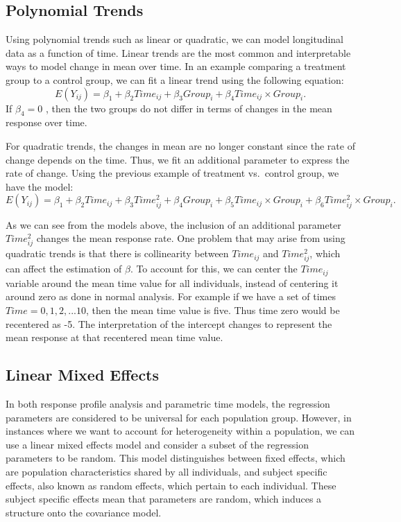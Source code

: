 \documentclass[12pt, twoside]{amherstthesis}
\begin{document}
\hypertarget{polynomial-trends}{%
\subsection{Polynomial Trends}\label{polynomial-trends}}

Using polynomial trends such as linear or quadratic, we can model longitudinal data as a function of time. Linear trends are the most common and interpretable ways to model change in mean over time. In an example comparing a treatment group to a control group, we can fit a linear trend using the following equation: \[E(Y_{ij}) = \beta_1 + \beta_2Time_{ij}+\beta_3Group_i+\beta_4Time_{ij} \times Group_i.\] If \(\beta_4 = 0\) , then the two groups do not differ in terms of changes in the mean response over time.

For quadratic trends, the changes in mean are no longer constant since the rate of change depends on the time. Thus, we fit an additional parameter to express the rate of change.
Using the previous example of treatment vs.~control group, we have the model:
\[E(Y_{ij}) = \beta_1 + \beta_2Time_{ij}+\beta_3Time^2_{ij}+\beta_4Group_i + \beta_5Time_{ij} \times Group_i + \beta_6Time^2_{ij} \times Group_i.\]

As we can see from the models above, the inclusion of an additional parameter \(Time^2_{ij}\) changes the mean response rate. One problem that may arise from using quadratic trends is that there is collinearity between \(Time_{ij}\) and \(Time^2_{ij}\), which can affect the estimation of \(\beta\). To account for this, we can center the \(Time_{ij}\) variable around the mean time value for all individuals, instead of centering it around zero as done in normal analysis. For example if we have a set of times \(Time = {0,1,2,...10}\), then the mean time value is five. Thus time zero would be recentered as -5. The interpretation of the intercept changes to represent the mean response at that recentered mean time value.

\hypertarget{linear-mixed-effects}{%
\subsection{Linear Mixed Effects}\label{linear-mixed-effects}}

In both response profile analysis and parametric time models, the regression parameters are considered to be universal for each population group. However, in instances where we want to account for heterogeneity within a population, we can use a linear mixed effects model and consider a subset of the regression parameters to be random. This model distinguishes between fixed effects, which are population characteristics shared by all individuals, and subject specific effects, also known as random effects, which pertain to each individual. These subject specific effects mean that parameters are random, which induces a structure onto the covariance model.
\end{document}
